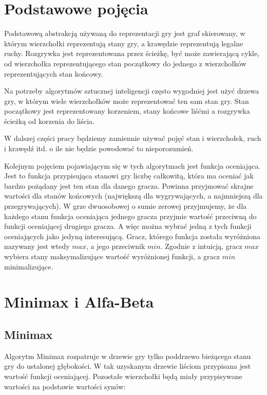 \documentclass{pracamgr}
\begin{document}
\section{Podstawowe pojęcia}

Podstawową abstrakcją używaną do reprezentacji gry jest graf skierowany, w którym wierzchołki reprezentują stany gry, a krawędzie reprezentują legalne ruchy. Rozgrywka jest reprezentowana przez ścieżkę, być może zawierającą cykle, od wierzchołka reprezentującego stan początkowy do jednego z wierzchołków reprezentujących stan końcowy.

Na potrzeby algorytmów sztucznej inteligencji często wygodniej jest użyć drzewa gry, w którym wiele wierzchołków może reprezentować ten sam stan gry. Stan początkowy jest reprezentowany korzeniem, stany końcowe liśćmi a rozgrywka ścieżką od korzenia do liścia.

W dalszej części pracy będziemy zamiennie używać pojęć stan i wierzchołek, ruch i krawędź itd. o ile nie będzie powodować to nieporozumień.

Kolejnym pojęciem pojawiającym się w tych algorytmach jest funkcja oceniająca. Jest to funkcja przypisująca stanowi gry liczbę całkowitą, która ma oceniać jak bardzo pożądany jest ten stan dla danego gracza. Powinna przyjmować skrajne wartości dla stanów końcowych (największą dla wygrywających, a najmniejszą dla przegrywających). W grze dwuosobowej o sumie zerowej przyjmujemy, że dla każdego stanu funkcja oceniająca jednego gracza przyjmie wartość przeciwną do funkcji oceniającej drugiego gracza. A więc można wybrać jedną z tych funkcji oceniających jako jedyną interesującą. Gracz, którego funkcja została wyróżniona nazywany jest wtedy \(max\), a jego przeciwnik \(min\). Zgodnie z intuicją, gracz \(max\) wybiera stany maksymalizujące wartość wyróżnionej funkcji, a gracz \(min\) minimalizujące.

\section{Minimax i Alfa-Beta}

\subsection{Minimax}

Algorytm Minimax rozpatruje w drzewie gry tylko poddrzewo bieżącego stanu gry do ustalonej głębokości. W tak uzyskanym drzewie liściom przypisana jest wartość funkcji oceniającej. Pozostałe wierzchołki będą miały przypisywane wartości na podstawie wartości synów:
\end{document}
